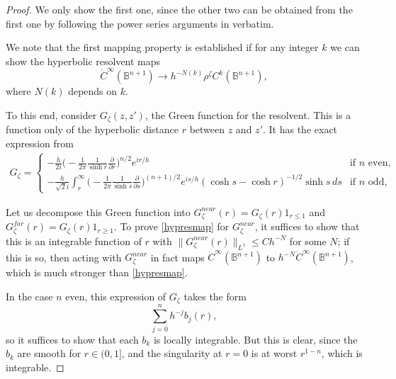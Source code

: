 \documentclass[10pt, a4paper, twoside]{amsart}
\numberwithin{equation}{section}
\theoremstyle{remark}
\begin{document}
\begin{proof}
We only show the first one, since the other two can be obtained from the first one by following the power series arguments in \cite{Mazzeo-Melrose} verbatim. 

We note that the first mapping property is established if for any integer $k$ we can show the hyperbolic resolvent maps 
\begin{equation}
 \dot{C}^\infty(\mathbb{B}^{n + 1}) \longrightarrow  h^{- N(k)} \rho^\zeta C^k(\mathbb{B}^{n + 1}),
 \label{hypresmap}\end{equation}
  where $N(k)$ depends on $k$. 

To this end, consider $G_\zeta(z, z')$, the Green function for the resolvent. This is a function only of the hyperbolic distance $r$ between $z$ and $z'$. It has the exact expression 
from \cite[p. 105]{Taylor2} \begin{eqnarray*}
G_\zeta  = \left\{ \begin{array}{ll} -\frac{h}{2i} \big( - \frac{1}{2\pi} \frac{1}{\sinh r} \frac{\partial}{\partial r} \big)^{n /2}e^{ir/h} & \mbox{if $n$ even}, \\ - \frac{h}{\sqrt{2} i} \int_{r}^\infty \big(- \frac{1}{2\pi} \frac{1}{\sinh s} \frac{\partial}{\partial s} \big)^{(n + 1)/2} e^{i s/h} (\cosh s - \cosh r)^{-1/2} \sinh s \, ds  & \mbox{if $n$ odd},\end{array} \right.
\end{eqnarray*}

Let us decompose this Green function into $G_\zeta^{near}(r) = G_\zeta(r) 1_{r \leq 1}$ and $G_\zeta^{far}(r) = G_\zeta(r) 1_{r \geq 1}$. To prove \eqref{hypresmap} for $G_\zeta^{near}$, it suffices to show that this is an integrable function of $r$ with $\| G_\zeta^{near}(r) \|_{L^1} \leq C h^{-N}$ for some $N$; if this is so, then acting with $G_\zeta^{near}$ in fact maps $ \dot{C}^\infty(\mathbb{B}^{n + 1})$ to $h^{-N}  \dot{C}^\infty(\mathbb{B}^{n + 1})$, which is much stronger than \eqref{hypresmap}. 

In the case $n$ even, this expression of $G_\zeta$ takes the form 
$$
\sum_{j=0}^{n} h^{-j} b_j(r),
$$
so it suffices to show that each $b_k$ is locally integrable. But this is clear, since the $b_k$ are smooth for $r \in (0, 1]$, and the singularity at $r=0$ is at worst $r^{1-n}$, which is integrable. 


\end{proof}
\end{document}

